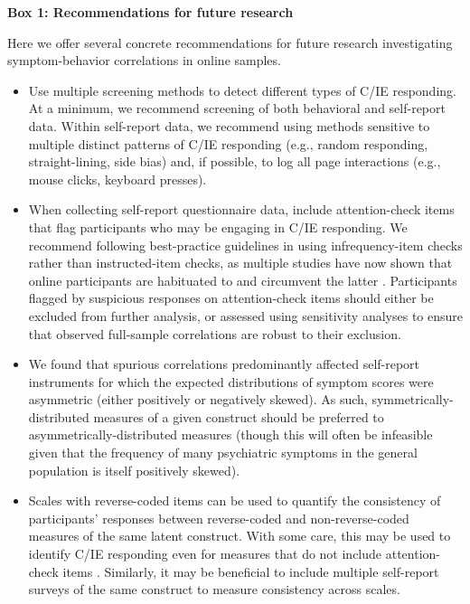 \documentclass[a4paper,notitlepage,12pt]{article}
\begin{document}
\begin{refsection}[main]
\newpage
\textbf{Box 1: Recommendations for future research}

Here we offer several concrete recommendations for future research investigating symptom-behavior correlations in online samples.

\begin{itemize}

    \item Use multiple screening methods to detect different types of C/IE responding. At a minimum, we recommend screening of both behavioral and self-report data. Within self-report data, we recommend using methods sensitive to multiple distinct patterns of C/IE responding (e.g., random responding, straight-lining, side bias) and, if possible, to log all page interactions (e.g., mouse clicks, keyboard presses).

    \item When collecting self-report questionnaire data, include attention-check items that flag participants who may be engaging in C/IE responding. We recommend following best-practice guidelines in using infrequency-item checks rather than instructed-item checks, as multiple studies have now shown that online participants are habituated to and circumvent the latter  \cite{barends2019noncompliant, thomas2017validity, hauser2016attentive}. Participants flagged by suspicious responses on attention-check items should either be excluded from further analysis, or assessed using sensitivity analyses to ensure that observed full-sample correlations are robust to their exclusion.

    \item We found that spurious correlations predominantly affected self-report instruments for which the expected distributions of symptom scores were asymmetric (either positively or negatively skewed). As such, symmetrically-distributed measures of a given construct should be preferred to asymmetrically-distributed measures (though this will often be infeasible given that the frequency of many psychiatric symptoms in the general population is itself positively skewed).
    
    \item Scales with reverse-coded items can be used to quantify the consistency of participants' responses between reverse-coded and non-reverse-coded measures of the same latent construct. With some care, this may be used to identify C/IE responding even for measures that do not include attention-check items \cite{emons2009detection}. Similarly, it may be beneficial to include multiple self-report surveys of the same construct to measure consistency across scales.
    

\end{itemize}
\end{refsection}
\end{document}
